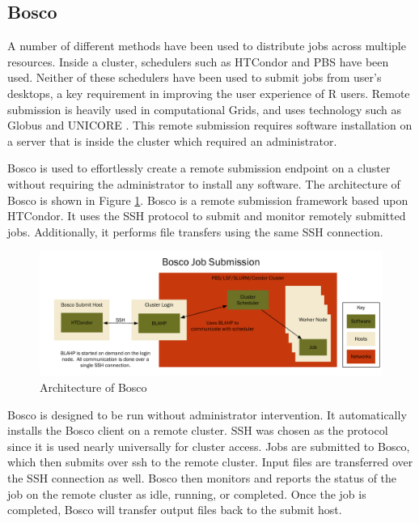 \documentclass[conference]{IEEEtran}
\begin{document}
\subsection{Bosco}
A number of different methods have been used to distribute jobs across multiple resources.  Inside a cluster, schedulers such as HTCondor  \cite{litzkow1988condor} and PBS \cite{henderson1995job} have been used.  Neither of these schedulers have been used to submit jobs from user's desktops, a key requirement in improving the user experience of R users.  Remote submission is heavily used in computational Grids, and uses technology such as Globus \cite{foster2001globus} and UNICORE \cite{romberg2002unicore}. This remote submission requires software installation on a server that is inside the cluster which required an administrator.

Bosco \cite{weitzel2014accessing} is used to effortlessly create a remote submission endpoint on a cluster without requiring the administrator to install any software.  The architecture of Bosco is shown in Figure \ref{fig:boscoarch}.  Bosco is a remote submission framework based upon HTCondor.  It uses the SSH \cite{ylonen2006secure} protocol to submit and monitor remotely submitted jobs.  Additionally, it performs file transfers using the same SSH connection.

\begin{figure}[ht]
\centering
\includegraphics[width=.8\textwidth]{images/ArchitectureGraph1.pdf}
\caption{Architecture of Bosco}
\label{fig:boscoarch}
\end{figure}

Bosco is designed to be run without administrator intervention.  It automatically installs the Bosco client on a remote cluster.  SSH was chosen as the protocol since it is used nearly universally for cluster access.  Jobs are submitted to Bosco, which then submits over ssh to the remote cluster.  Input files are transferred over the SSH connection as well.  Bosco then monitors and reports the status of the job on the remote cluster as idle, running, or completed.  Once the job is completed, Bosco will transfer output files back to the submit host.
\end{document}
